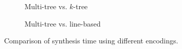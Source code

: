 \begin{figure}[t]
    \centering
     \begin{subfigure}[b]{0.47\textwidth}
         \centering
         \caption{Multi-tree vs. \(k\)-tree}
         \label{fig:mt_vs_ktree}
     \end{subfigure}
     \hfill
     \begin{subfigure}[b]{0.47\textwidth}
         \centering
         \caption{Multi-tree vs. line-based}
         \label{fig:mt_vs_lines}
     \end{subfigure}
\captionsetup{belowskip=-8pt}
\caption{Comparison of synthesis time using different encodings.}
\label{fig:time-comparison-encodings}
\end{figure}